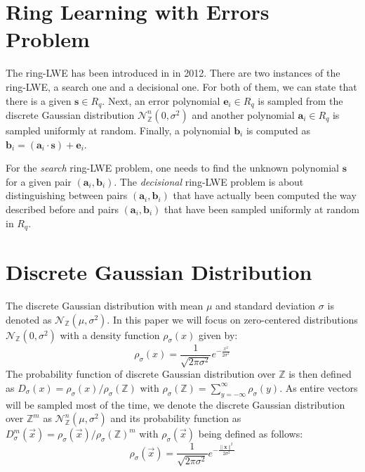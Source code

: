\section{Ring Learning with Errors Problem}
The \acf{ring-LWE} has been introduced in \cite{cryptoeprint:2012:230} in 2012. There are two instances of the \ac{ring-LWE}, a search one and a decisional one. For both of them, we can state that there is a given \(\textbf{s} \in R_q\). Next, an error polynomial \(\textbf{e}_i \in R_q\) is sampled from the discrete Gaussian distribution \(\mathcal{N}_\mathbb{Z}^{n} (0, \sigma^2)\) and another polynomial \(\textbf{a}_i \in R_q\) is sampled uniformly at random. Finally, a polynomial \(\textbf{b}_i\) is computed as \(\textbf{b}_i = (\textbf{a}_i \cdot \textbf{s}) + \textbf{e}_i\).

For the \textit{search} \ac{ring-LWE} problem, one needs to find the unknown polynomial \(\textbf{s}\) for a given pair \((\textbf{a}_i, \textbf{b}_i)\). The \textit{decisional} \ac{ring-LWE} problem is about distinguishing between pairs \((\textbf{a}_i, \textbf{b}_i)\) that have actually been computed the way described before and pairs \((\textbf{a}_i, \textbf{b}_i)\) that have been sampled uniformly at random in \(R_q\).

\section{Discrete Gaussian Distribution}
The discrete Gaussian distribution with mean \(\mu\) and standard deviation \(\sigma\) is denoted as \(\mathcal{N}_\mathbb{Z} (\mu, \sigma^2)\). In this paper we will focus on zero-centered distributions \(\mathcal{N}_\mathbb{Z} (0, \sigma^2)\) with a density function \(\rho_\sigma(x)\) given by:
\begin{equation}
	\rho_\sigma(x)=\frac{1}{\sqrt{2\pi \sigma^2}}e^{-\frac{x^2}{2\sigma^2}}
\end{equation}
The probability function of discrete Gaussian distribution over \(\mathbb{Z}\) is then defined as \(D_\sigma(x)=\rho_\sigma(x)/\rho_\sigma(\mathbb{Z})\) with \(\rho_\sigma(\mathbb{Z})=\sum_{y=-\infty}^{\infty} \rho_\sigma(y)\). As entire vectors will be sampled most of the time, we denote the discrete Gaussian distribution over \(\mathbb{Z}^m\) as \(\mathcal{N}_\mathbb{Z}^{n} (\mu, \sigma^2)\) and its probability function as \(D_\sigma^m(\vec{x})=\rho_\sigma(\vec{x})/\rho_\sigma(\mathbb{Z})^m\) with \(\rho_\sigma(\vec{x})\) being defined as follows:
\begin{equation}
	\rho_\sigma(\vec{x})=\frac{1}{\sqrt{2\pi \sigma^2}}e^{-\frac{\|\textbf{x}\|^2}{2\sigma^2}}
\end{equation}


